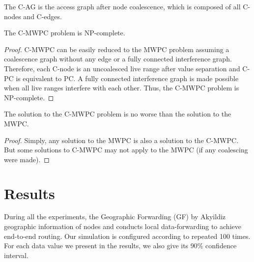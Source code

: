 \documentclass[acmtog, authorversion]{acmart}
\begin{document}
\begin{definition}The C-AG is the access
graph after node coalescence, which is composed of all C-nodes and C-edges.
\end{definition}

\begin{lemma}
The C-MWPC problem is NP-complete.
\end{lemma}
\begin{proof} C-MWPC can be easily reduced to the MWPC problem assuming a
coalescence graph without any edge or a fully connected interference graph.
Therefore, each C-node is an uncoalesced live range after value separation
and C-PC is equivalent to PC. A fully connected interference graph is made
possible when all live ranges interfere with each other. Thus, the C-MWPC
problem is NP-complete.
\end{proof}

\begin{lemma}The solution to the C-MWPC problem is no
worse than the solution to the MWPC.
\end{lemma}
\begin{proof}
Simply, any solution to the MWPC is also a solution to the
C-MWPC. But some solutions to C-MWPC may not apply to the MWPC (if any
coalescing were made).
\end{proof}

\section{Results}

During all the experiments, the Geographic Forwarding (GF) by Akyildiz
geographic information of nodes and conducts local data-forwarding to
achieve end-to-end routing. Our simulation is configured according to
repeated 100 times. For each data value we present in the results, we
also give its 90\% confidence interval.
\end{document}

